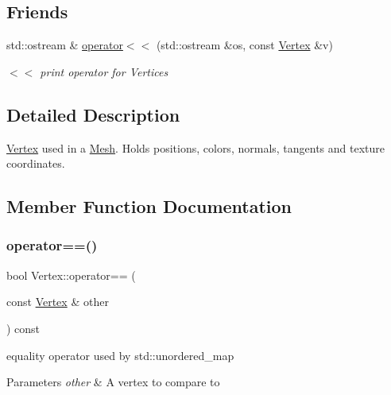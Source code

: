 \subsection*{Friends}
\begin{DoxyCompactItemize}
\item 
std\+::ostream \& \mbox{\hyperlink{struct_vertex_aa80cb53b0a61b605b5e10d5b3fe9d505}{operator$<$$<$}} (std\+::ostream \&os, const \mbox{\hyperlink{struct_vertex}{Vertex}} \&v)
\begin{DoxyCompactList}\small\item\em $<$$<$ print operator for Vertices \end{DoxyCompactList}\end{DoxyCompactItemize}


\subsection{Detailed Description}
\mbox{\hyperlink{struct_vertex}{Vertex}} used in a \mbox{\hyperlink{class_mesh}{Mesh}}. Holds positions, colors, normals, tangents and texture coordinates. 

\subsection{Member Function Documentation}
\mbox{\label{struct_vertex_a80a54a84866d511b63bcc6f38899bed9}} 
\subsubsection{\texorpdfstring{operator==()}{operator==()}}
{\footnotesize\ttfamily bool Vertex\+::operator== (\begin{DoxyParamCaption}\item[{const \mbox{\hyperlink{struct_vertex}{Vertex}} \&}]{other }\end{DoxyParamCaption}) const\hspace{0.3cm}{\ttfamily [inline]}}



equality operator used by std\+::unordered\+\_\+map 


\begin{DoxyParams}{Parameters}
{\em other} & A vertex to compare to \\
\hline
\end{DoxyParams}


